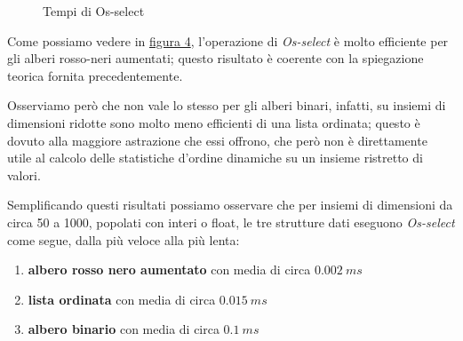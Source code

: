 \documentclass[onecolumn]{article}
\begin{document}
\begin{figure}[H]
	\caption{Tempi di Os-select}
	\label{fig:os-select-s}
\end{figure}
\newpage

Come possiamo vedere in \hyperref[fig:os-select-s]{figura 4}, l'operazione di \textit{Os-select} è molto efficiente per gli alberi rosso-neri aumentati; questo risultato è coerente con la spiegazione teorica fornita precedentemente.

Osserviamo però che non vale lo stesso per gli alberi binari, infatti, su insiemi di dimensioni ridotte sono molto meno efficienti di una lista ordinata; questo è dovuto alla maggiore astrazione che essi offrono, che però non è direttamente utile al calcolo delle statistiche d'ordine dinamiche su un insieme ristretto di valori.

Semplificando questi risultati possiamo osservare che per insiemi di dimensioni da circa 50 a 1000, popolati con interi o float, le tre strutture dati eseguono \textit{Os-select} come segue, dalla più veloce alla più lenta:

\begin{enumerate}
    \item \textbf{albero rosso nero aumentato} con media di circa \(0.002\:ms\)
    \item \textbf{lista ordinata} con media di circa \(0.015\:ms\)
    \item \textbf{albero binario} con media di circa \(0.1\:ms\)
\end{enumerate}
\end{document}
